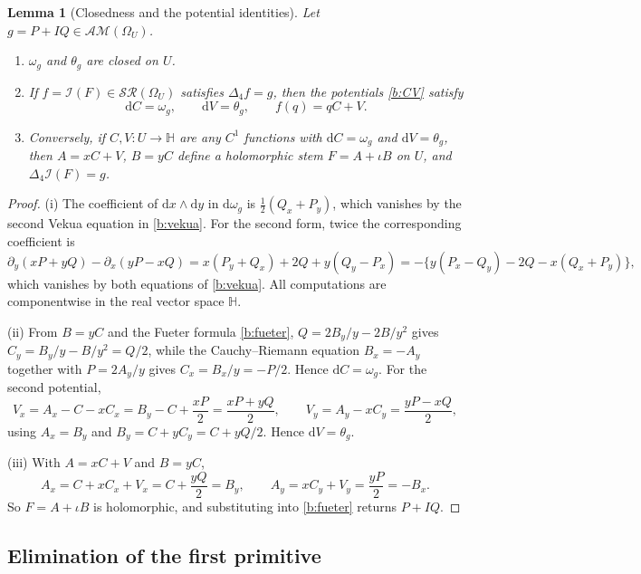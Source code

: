 \documentclass[11pt,a4paper]{article}
\numberwithin{equation}{section}
\newtheorem{lemma}[theorem]{Lemma}
\theoremstyle{definition}
\theoremstyle{remark}
\theoremstyle{plain}
\newcommand{\HH}{\mathbb H}
\newcommand{\lap}{\Delta_4}
\newcommand{\I}{\mathcal I}
\newcommand{\SR}{\mathcal{SR}}
\newcommand{\AM}{\mathcal{AM}}
\newcommand{\Om}{\Omega}
\newcommand{\om}{\omega}
\newcommand{\thet}{\theta}
\newcommand{\pot}{C}          %
\newcommand{\potV}{V}         %
\newcommand{\dd}{\mathrm d}
\begin{document}
\begin{lemma}[Closedness and the potential identities]
\label{b:lem:forms}
Let $g=P+IQ\in\AM(\Om_U)$.
\begin{enumerate}[label=\textup{(\roman*)}]
\item $\om_g$ and $\thet_g$ are closed on $U$.
\item If $f=\I(F)\in\SR(\Om_U)$ satisfies $\lap f=g$, then the potentials
\eqref{b:CV} satisfy
\begin{equation}
 \dd\pot=\om_g,\qquad \dd\potV=\thet_g,\qquad f(q)=q\pot+\potV .
 \label{b:potential-identities}
\end{equation}
\item Conversely, if $\pot,\potV:U\to\HH$ are any $C^1$ functions with
$\dd\pot=\om_g$ and $\dd\potV=\thet_g$, then $A=x\pot+\potV$, $B=y\pot$ define a
holomorphic stem $F=A+\iota B$ on $U$, and $\lap\I(F)=g$.
\end{enumerate}
\end{lemma}

\begin{proof}
(i) The coefficient of $\dd x\wedge\dd y$ in $\dd\om_g$ is $\tfrac12(Q_x+P_y)$,
which vanishes by the second Vekua equation in \eqref{b:vekua}.  For the second
form, twice the corresponding coefficient is
\[
 \partial_y(xP+yQ)-\partial_x(yP-xQ)
 =x(P_y+Q_x)+2Q+y(Q_y-P_x)
 =-\bigl\{y(P_x-Q_y)-2Q-x(Q_x+P_y)\bigr\},
\]
which vanishes by both equations of \eqref{b:vekua}.  All computations are
componentwise in the real vector space $\HH$.

(ii) From $B=y\pot$ and the Fueter formula \eqref{b:fueter}, $Q=2B_y/y-2B/y^2$
gives $\pot_y=B_y/y-B/y^2=Q/2$, while the Cauchy--Riemann equation $B_x=-A_y$
together with $P=2A_y/y$ gives $\pot_x=B_x/y=-P/2$.  Hence $\dd\pot=\om_g$.
For the second potential,
\[
 \potV_x=A_x-\pot-x\pot_x=B_y-\pot+\frac{xP}{2}=\frac{xP+yQ}{2},
 \qquad
 \potV_y=A_y-x\pot_y=\frac{yP-xQ}{2},
\]
using $A_x=B_y$ and $B_y=\pot+y\pot_y=\pot+yQ/2$.  Hence $\dd\potV=\thet_g$.

(iii) With $A=x\pot+\potV$ and $B=y\pot$,
\[
 A_x=\pot+x\pot_x+\potV_x=\pot+\frac{yQ}{2}=B_y,
 \qquad
 A_y=x\pot_y+\potV_y=\frac{yP}{2}=-B_x .
\]
So $F=A+\iota B$ is holomorphic, and substituting into \eqref{b:fueter}
returns $P+IQ$.
\end{proof}

\subsection{Elimination of the first primitive}
\label{b:sub:elimination}
\end{document}
